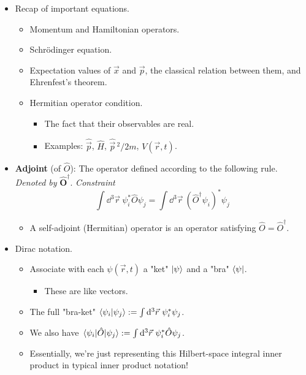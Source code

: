 \documentclass[../notes.tex]{subfiles}
\begin{document}
\begin{itemize}
    \item {}Recap of important equations.
    \begin{itemize}
        \item Momentum and Hamiltonian operators.
        \item Schr\"{o}dinger equation.
        \item Expectation values of $\vec{x}$ and $\vec{p}$, the classical relation between them, and Ehrenfest's theorem.
        \item Hermitian operator condition.
        \begin{itemize}
            \item The fact that their observables are real.
            \item Examples: $\hat{\vec{p}}$, $\hat{H}$, $\hat{\vec{p}}{\,}^2/2m$, $V(\vec{r},t)$.
        \end{itemize}
    \end{itemize}
    \item \textbf{Adjoint} (of $\hat{O}$): The operator defined according to the following rule. \emph{Denoted by} $\bm{\hat{O}^\dagger}$. \emph{Constraint}
    \begin{equation*}
        \int\dd^3\vec{r}\ \psi_i^*\hat{O}\psi_j = \int\dd^3\vec{r}\ (\hat{O}^\dagger\psi_i)^*\psi_j
    \end{equation*}
    \begin{itemize}
        \item A self-adjoint (Hermitian) operator is an operator satisfying $\hat{O}=\hat{O}^\dagger$.
    \end{itemize}
    \item Dirac notation.
    \begin{itemize}
        \item Associate with each $\psi(\vec{r},t)$ a "ket" $\ket{\psi}$ and a "bra" $\bra{\psi}$.
        \begin{itemize}
            \item These are like vectors.
        \end{itemize}
        \item The full "bra-ket" $\braket{\psi_i}{\psi_j}:=\int\dd^3\vec{r}\ \psi_i^*\psi_j$.
        \item We also have $\mel{\psi_i}{\hat{O}}{\psi_j}:=\int\dd^3\vec{r}\ \psi_i^*\hat{O}\psi_j$.
        \item Essentially, we're just representing this Hilbert-space integral inner product in typical inner product notation!

\end{itemize}
\end{itemize}
\end{document}
